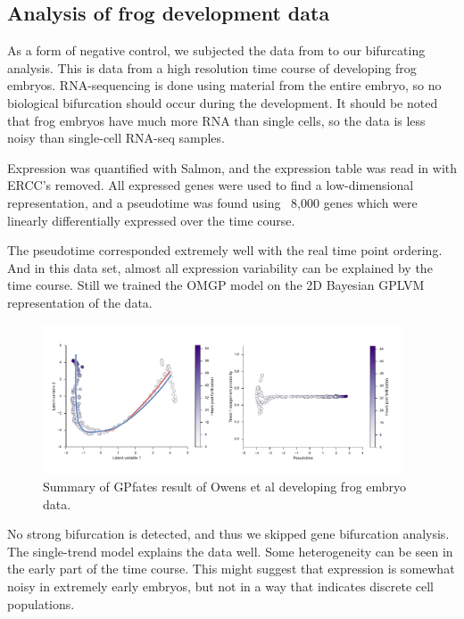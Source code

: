 \subsection{Analysis of frog development data}

As a form of negative control, we subjected the data from \cite{Owens2016-op} to our bifurcating analysis. This is data from a high resolution time course of developing frog embryos. RNA-sequencing is done using material from the entire embryo, so no biological bifurcation should occur during the development. It should be noted that frog embryos have much more RNA than single cells, so the data is less noisy than single-cell RNA-seq samples.

Expression was quantified with Salmon, and the expression table was read in with ERCC's removed. All expressed genes were used to find a low-dimensional representation, and a pseudotime was found using ~8,000 genes which were linearly differentially expressed over the time course.

The pseudotime corresponded extremely well with the real time point ordering. And in this data set, almost all expression variability can be explained by the time course. Still we trained the OMGP model on the 2D Bayesian GPLVM representation of the data.

\begin{figure}
    \centering
    \includegraphics[width=0.95\textwidth]{frog-illustration.pdf}
    \caption{Summary of GPfates result of Owens et al developing frog embryo data.}
    \label{fig:owens}
\end{figure}

No strong bifurcation is detected, and thus we skipped gene bifurcation analysis. The single-trend model explains the data well. Some heterogeneity can be seen in the early part of the time course. This might suggest that expression is somewhat noisy in extremely early embryos, but not in a way that indicates discrete cell populations.

